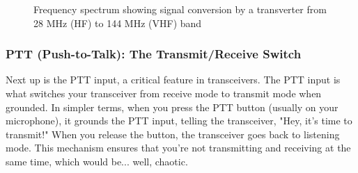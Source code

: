 \begin{figure}[h!]
    \centering
    \caption{Frequency spectrum showing signal conversion by a transverter from 28 MHz (HF) to 144 MHz (VHF) band}
    \label{fig:transverter-signals}
\end{figure}

\subsubsection*{PTT (Push-to-Talk): The Transmit/Receive Switch}
Next up is the PTT input, a critical feature in transceivers. The PTT input is what switches your transceiver from receive mode to transmit mode when grounded. In simpler terms, when you press the PTT button (usually on your microphone), it grounds the PTT input, telling the transceiver, "Hey, it's time to transmit!" When you release the button, the transceiver goes back to listening mode. This mechanism ensures that you're not transmitting and receiving at the same time, which would be... well, chaotic.


